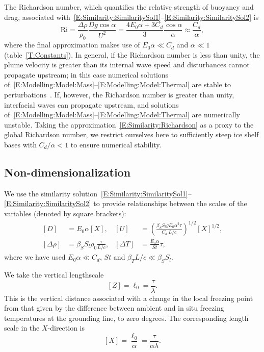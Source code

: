 \documentclass[openacc]{rsproca_new}%
\begin{document}
The Richardson number, which quantifies the relative strength of buoyancy and drag, associated with~\eqref{E:Similarity:SimilaritySol1}--\eqref{E:Similarity:SimilaritySol2} is
\begin{equation}\label{E:Similarity:Richardson}
\mathrm{Ri} = \frac{\Delta \rho}{\rho_0}\frac{D g \cos \alpha}{U^2} = \frac{4E_0 \alpha + 3C_d}{3} \frac{\cos \alpha}{\alpha} \approx \frac{C_d}{\alpha},
\end{equation}
where the final approximation makes use of $E_0 \alpha \ll C_d$ and $\alpha \ll 1$ (table~\ref{T:Constants}). In general, if the Richardson number is less than unity, the plume velocity is greater than its internal wave speed and disturbances cannot propagate upstream; in this case numerical solutions of~\eqref{E:Modelling:Model:Mass}--\eqref{E:Modelling:Model:Thermal} are stable to perturbations~\citep{Jenkinsphdthesis}. If, however, the Richardson number is greater than unity, interfacial waves can propagate upstream, and solutions of~\eqref{E:Modelling:Model:Mass}--\eqref{E:Modelling:Model:Thermal} are numerically unstable. Taking the approximation~\eqref{E:Similarity:Richardson} as a proxy to the global Richardson number, we restrict ourselves here to sufficiently steep ice shelf bases with $C_d/\alpha < 1$ to ensure numerical stability.

\subsection{Non-dimensionalization}\label{S:Model:NonDim}
We use the similarity solution~\eqref{E:Similarity:SimilaritySol1}--\eqref{E:Similarity:SimilaritySol2} to provide relationships between the scales of the variables (denoted by square brackets):
\begin{align}
\left[D\right] &= E_0 \alpha \left[X\right], & \left[U\right] &= \left(\frac{\beta_S S_l g E_0 \alpha^2 \tau}{C_d ~L/c}\right)^{1/2}[X]^{1/2},\label{E:Similarity:Scales1}\\
\left[\Delta \rho\right] &= \beta_S S_l \rho_0 \frac{\tau}{L/c}, & \left[\Delta T\right] &= \frac{E_0 \alpha}{St}\tau,\label{E:Similarity:Scales2}
\end{align}
where we have used $E_0 \alpha \ll C_d$, $St$ and $\beta_T L /c \ll \beta_S S_l$.

We take the vertical lengthscale
\begin{equation}
\left[Z\right] = \ell_0=\frac{ \tau }{\lambda}.
\end{equation}
This is the vertical distance associated with a change in the local freezing point from that given by the difference between ambient and in situ freezing temperatures at the grounding line, to zero degrees. The corresponding length scale in the $X$-direction is
\begin{equation}\label{E:NonDim:Xscale}
\left[X\right] =\frac{ \ell_0}{\alpha}=\frac{ \tau }{\alpha \lambda}.
\end{equation}
\end{document}

